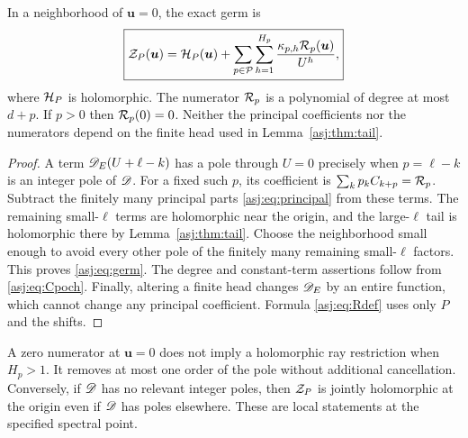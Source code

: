 \begin{theorem}\label{asj:thm:transfer}
In a neighborhood of $\boldsymbol u=0$, the exact germ is
\begin{equation}\label{asj:eq:germ}
 \boxed{\displaystyle
 \mathcal Z_P(\boldsymbol u)
  =\mathcal H_P(\boldsymbol u)
       +\sum_{p\in\mathcal P}\sum_{h=1}^{H_p}
            \frac{\kappa_{p,h}\mathcal R_p(\boldsymbol u)}{U^h},}
\end{equation}
where $\mathcal H_P$ is holomorphic. The numerator $\mathcal R_p$ is a polynomial
of degree at most $d+p$. If $p>0$ then $\mathcal R_p(0)=0$.
Neither the principal coefficients nor the numerators depend on the
finite head used in Lemma~\ref{asj:thm:tail}.
\end{theorem}
\begin{proof}
A term $\mathscr D_E(U+\ell-k)$ has a pole through $U=0$ precisely when
$p=\ell-k$ is an integer pole of $\mathscr D$. For a fixed such $p$, its
coefficient is $\sum_k p_k C_{k+p}=\mathcal R_p$. Subtract the finitely many
principal parts \eqref{asj:eq:principal} from these terms. The remaining
small-$\ell$ terms are holomorphic near the origin, and the large-$\ell$
tail is holomorphic there by Lemma~\ref{asj:thm:tail}. Choose the neighborhood
small enough to avoid every other pole of the finitely many remaining
small-$\ell$ factors. This proves \eqref{asj:eq:germ}.
The degree and constant-term assertions follow from \eqref{asj:eq:Cpoch}.
Finally, altering a finite head changes $\mathscr D_E$ by an entire function,
which cannot change any principal coefficient. Formula \eqref{asj:eq:Rdef}
uses only $P$ and the shifts.
\end{proof}

A zero numerator at $\boldsymbol u=0$ does not imply a holomorphic ray
restriction when $H_p>1$. It removes at most one order of the pole without
additional cancellation. Conversely, if $\mathscr D$ has no relevant integer poles,
then $\mathcal Z_P$ is jointly holomorphic at the origin even if $\mathscr D$ has poles
elsewhere. These are local statements at the specified spectral point.
